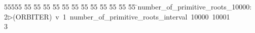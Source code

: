 %
%
\begin{tabbing}
55555 \= 55 \= 55 \= 55 \= 55 \= 55 \= 55 \= 55 \= 55 \= 55 \= 55 \= 55 \= 55 \= \>number\_of\_primitive\_roots\_10000:\\[0pt]
2\>$\triangleright$\>(ORBITER)\ v\ 1\ number\_of\_primitive\_roots\_interval\ 10000\ 10001\\[0pt]
3\>\end{tabbing}
